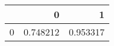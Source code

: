\begin{tabular}{lrr}
\toprule
{} &         0 &         1 \\
\midrule
0 &  0.748212 &  0.953317 \\
\bottomrule
\end{tabular}
